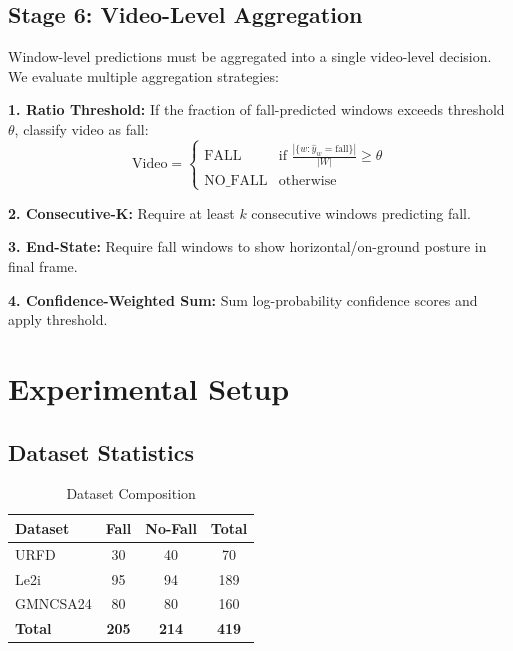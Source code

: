 \documentclass[conference]{IEEEtran}
\begin{document}
\subsection{Stage 6: Video-Level Aggregation}

Window-level predictions must be aggregated into a single video-level decision. We evaluate multiple aggregation strategies:

\textbf{1. Ratio Threshold:} If the fraction of fall-predicted windows exceeds threshold $\theta$, classify video as fall:
\begin{equation}
\text{Video} = \begin{cases}
\text{FALL} & \text{if } \frac{|\{w : \hat{y}_w = \text{fall}\}|}{|W|} \geq \theta \\
\text{NO\_FALL} & \text{otherwise}
\end{cases}
\end{equation}

\textbf{2. Consecutive-K:} Require at least $k$ consecutive windows predicting fall.

\textbf{3. End-State:} Require fall windows to show horizontal/on-ground posture in final frame.

\textbf{4. Confidence-Weighted Sum:} Sum log-probability confidence scores and apply threshold.

\section{Experimental Setup}

\subsection{Dataset Statistics}

\begin{table}[H]
\centering
\caption{Dataset Composition}
\label{tab:datasets}
\begin{tabular}{lccc}
\toprule
\textbf{Dataset} & \textbf{Fall} & \textbf{No-Fall} & \textbf{Total} \\
\midrule
URFD & 30 & 40 & 70 \\
Le2i & 95 & 94 & 189 \\
GMNCSA24 & 80 & 80 & 160 \\
\midrule
\textbf{Total} & \textbf{205} & \textbf{214} & \textbf{419} \\
\bottomrule
\end{tabular}
\end{table}
\end{document}
